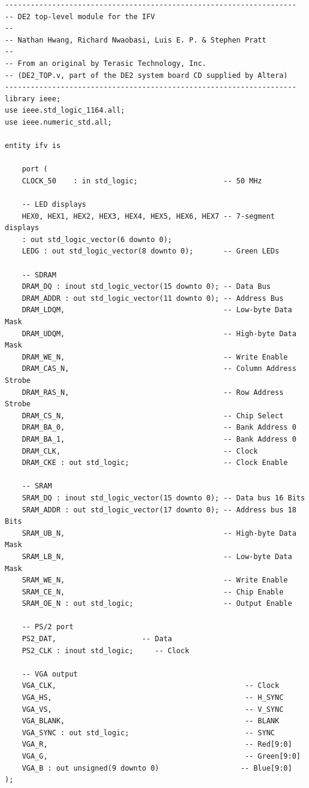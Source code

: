 \documentclass{article}
\begin{document}
\begin{lstlisting}
--------------------------------------------------------------------
-- DE2 top-level module for the IFV
--
-- Nathan Hwang, Richard Nwaobasi, Luis E. P. & Stephen Pratt
--
-- From an original by Terasic Technology, Inc.
-- (DE2_TOP.v, part of the DE2 system board CD supplied by Altera)
--------------------------------------------------------------------
library ieee;
use ieee.std_logic_1164.all;
use ieee.numeric_std.all;

entity ifv is

	port (
	CLOCK_50	: in std_logic;                    -- 50 MHz

	-- LED displays
	HEX0, HEX1, HEX2, HEX3, HEX4, HEX5, HEX6, HEX7 -- 7-segment displays
	: out std_logic_vector(6 downto 0);
	LEDG : out std_logic_vector(8 downto 0);       -- Green LEDs

	-- SDRAM
	DRAM_DQ : inout std_logic_vector(15 downto 0); -- Data Bus
	DRAM_ADDR : out std_logic_vector(11 downto 0); -- Address Bus    
	DRAM_LDQM,                                     -- Low-byte Data Mask 
	DRAM_UDQM,                                     -- High-byte Data Mask
	DRAM_WE_N,                                     -- Write Enable
	DRAM_CAS_N,                                    -- Column Address Strobe
	DRAM_RAS_N,                                    -- Row Address Strobe
	DRAM_CS_N,                                     -- Chip Select
	DRAM_BA_0,                                     -- Bank Address 0
	DRAM_BA_1,                                     -- Bank Address 0
	DRAM_CLK,                                      -- Clock
	DRAM_CKE : out std_logic;                      -- Clock Enable

	-- SRAM   
	SRAM_DQ : inout std_logic_vector(15 downto 0); -- Data bus 16 Bits
	SRAM_ADDR : out std_logic_vector(17 downto 0); -- Address bus 18 Bits
	SRAM_UB_N,                                     -- High-byte Data Mask 
	SRAM_LB_N,                                     -- Low-byte Data Mask 
	SRAM_WE_N,                                     -- Write Enable
	SRAM_CE_N,                                     -- Chip Enable
	SRAM_OE_N : out std_logic;                     -- Output Enable	

	-- PS/2 port
	PS2_DAT,                    -- Data
	PS2_CLK : inout std_logic;     -- Clock

	-- VGA output
	VGA_CLK,                                            -- Clock
	VGA_HS,                                             -- H_SYNC
	VGA_VS,                                             -- V_SYNC
	VGA_BLANK,                                          -- BLANK
	VGA_SYNC : out std_logic;                           -- SYNC
	VGA_R,                                              -- Red[9:0]
	VGA_G,                                              -- Green[9:0]
	VGA_B : out unsigned(9 downto 0)                   -- Blue[9:0]
);
  

\end{lstlisting}
\end{document}

